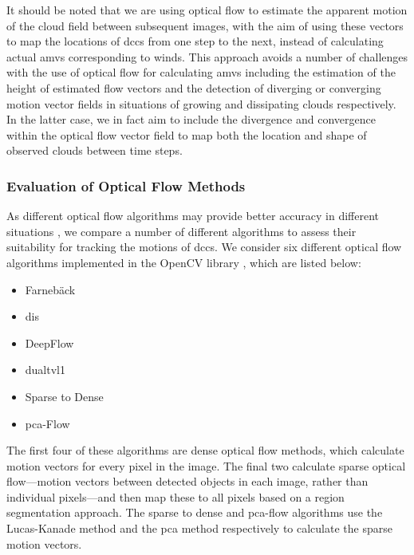 It should be noted that we are using optical flow to estimate the apparent motion of the cloud field between subsequent images, with the aim of using these vectors to map the locations of \acrshort{dcc}s from one step to the next, instead of calculating actual \acrshort{amv}s corresponding to winds.
This approach avoids a number of challenges with the use of optical flow for calculating \acrshort{amv}s including the estimation of the height of estimated flow vectors and the detection of diverging or converging motion vector fields in situations of growing and dissipating clouds respectively.
In the latter case, we in fact aim to include the divergence and convergence within the optical flow vector field to map both the location and shape of observed clouds between time steps.

\subsubsection{Evaluation of Optical Flow Methods}

As different optical flow algorithms may provide better accuracy in different situations \citep{baker_database_2011}, we compare a number of different algorithms to assess their suitability for tracking the motions of \acrshort{dcc}s.
We consider six different optical flow algorithms implemented in the OpenCV library \citep{opencv_library}, which are listed below:

\begin{itemize}
    \item Farnebäck \citep{farneback_two-frame_2003}
    \item \acrshort{dis} \citep{kroeger_fast_2016}
    \item DeepFlow \citep{weinzaepfel_deepflow_2013}
    \item \acrshort{dualtvl1} \citep{zach_duality_2007, perez_tv-l1_2013}
    \item Sparse to Dense \citep{bouguet_pyramidal_1999}
    \item \acrshort{pca}-Flow \citep{wulff_efficient_2015}
\end{itemize}

The first four of these algorithms are dense optical flow methods, which calculate motion vectors for every pixel in the image.
The final two calculate sparse optical flow---motion vectors between detected objects in each image, rather than individual pixels---and then map these to all pixels based on a region segmentation approach.
The sparse to dense and \acrshort{pca}-flow algorithms use the Lucas-Kanade method \citep{lucas_iterative_1981} and the \acrshort{pca} method respectively to calculate the sparse motion vectors.

